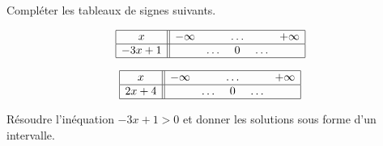 
\begin{exercice}\label{exosmath-0321}

    Compléter les tableaux de signes suivants.
    \begin{multicols}{2}
    \begin{equation*}
        \begin{array}[]{|c||ccccc|}
            \hline
             x&-\infty&&\ldots&&+\infty\\
              \hline
              -3x+1&&\ldots&0&\ldots&\\ 
              \hline 
               \end{array}
           \end{equation*}


    \begin{equation*}
        \begin{array}[]{|c||ccccc|}
            \hline
             x&-\infty&&\ldots&&+\infty\\
              \hline
              2x+4&&\ldots&0&\ldots&\\ 
              \hline 
               \end{array}
           \end{equation*}

    \end{multicols}
    Résoudre l'inéquation \( -3x+1>0\) et donner les solutions sous forme d'un intervalle.

\end{exercice}
